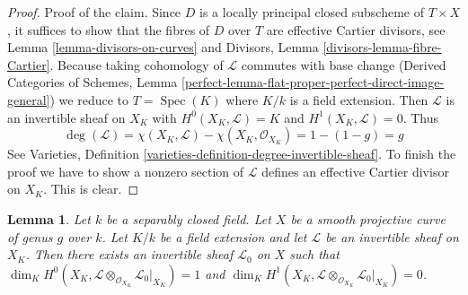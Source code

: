 \documentclass{stacks-project}
\theoremstyle{plain}
\newtheorem{lemma}[subsection]{Lemma}
\theoremstyle{definition}
\theoremstyle{remark}
\numberwithin{equation}{subsection}
\def\Spec{\mathop{\mathrm{Spec}}}
\begin{document}
\begin{proof}
\medskip\noindent
Proof of the claim. Since $D$ is a locally principal closed subscheme
of $T \times X$, it suffices to show that the fibres of $D$ over $T$ are
effective Cartier divisors, see Lemma \ref{lemma-divisors-on-curves} and
Divisors, Lemma \ref{divisors-lemma-fibre-Cartier}. Because taking
cohomology of $\mathcal{L}$ commutes with base change
(Derived Categories of Schemes, Lemma
\ref{perfect-lemma-flat-proper-perfect-direct-image-general})
we reduce to $T = \Spec(K)$ where $K/k$ is a field extension.
Then $\mathcal{L}$ is an invertible sheaf on $X_K$ with
$H^0(X_K, \mathcal{L}) = K$ and $H^1(X_K, \mathcal{L}) = 0$. Thus
$$
\deg(\mathcal{L}) = \chi(X_K, \mathcal{L}) - \chi(X_K, \mathcal{O}_{X_K})
= 1 - (1 - g) = g
$$
See Varieties, Definition \ref{varieties-definition-degree-invertible-sheaf}.
To finish the proof we have to show a nonzero section of $\mathcal{L}$
defines an effective Cartier divisor on $X_K$.
This is clear.
\end{proof}

\begin{lemma}
\label{lemma-twist-with-general-divisor}
Let $k$ be a separably closed field. Let $X$ be a smooth projective
curve of genus $g$ over $k$. Let $K/k$ be a field extension and let
$\mathcal{L}$ be an invertible sheaf on $X_K$. Then there exists an
invertible sheaf $\mathcal{L}_0$ on $X$ such that
$\dim_K H^0(X_K,
\mathcal{L} \otimes_{\mathcal{O}_{X_K}} \mathcal{L}_0|_{X_K}) = 1$ and
$\dim_K H^1(X_K,
\mathcal{L} \otimes_{\mathcal{O}_{X_K}} \mathcal{L}_0|_{X_K}) = 0$.
\end{lemma}
\end{document}
